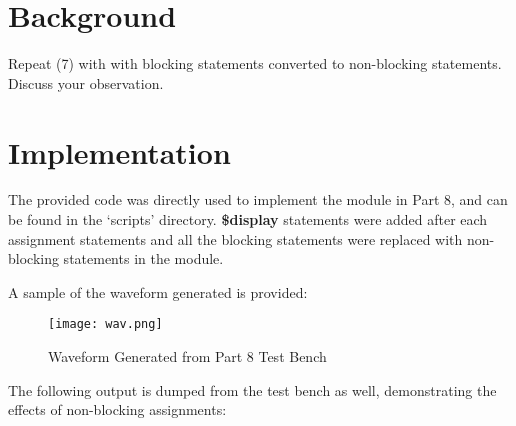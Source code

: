 \documentclass[paper=usletter, fontsize=12pt]{article}
\begin{document}
    \vspace{-0.1in}

    \section{Background}
    Repeat (7) with with blocking statements converted to non-blocking statements. Discuss your observation.

    \section{Implementation}
    The provided code was directly used to implement the module in Part 8, and can be found in the `scripts' directory. \textbf{\$display} statements were added after each assignment statements and all the blocking statements were replaced with non-blocking statements in the module.

    A sample of the waveform generated is provided:

    \begin{figure}[ht]
        \begin{center}
            \texttt{[image: wav.png]}
            \caption{Waveform Generated from Part 8 Test Bench} \label{fig:wav}
        \end{center}
    \end{figure}

    The following output is dumped from the test bench as well, demonstrating the effects of non-blocking assignments:
\end{document}
